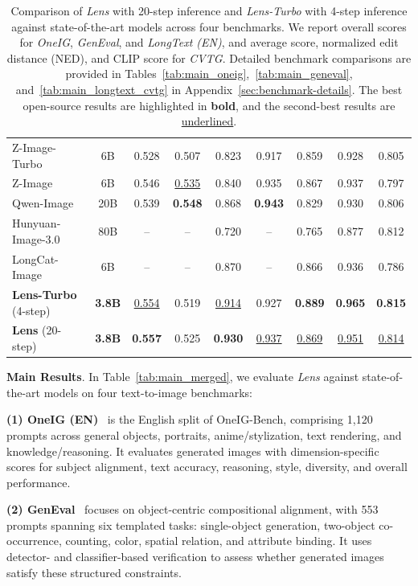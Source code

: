 \documentclass{llmxive}
\begin{document}
\begin{table}[!t]
\begin{tabular}{l|c|cc|c|c|ccc}
    Z-Image-Turbo & 6B
      & 0.528 & 0.507 & 0.823 & 0.917 & 0.859 & 0.928 & 0.805 \\
    Z-Image & 6B
      & 0.546 & \underline{0.535} & 0.840 & 0.935 & 0.867 & 0.937 & 0.797 \\
    Qwen-Image & 20B
      & 0.539 & \textbf{0.548} & 0.868 & \textbf{0.943} & 0.829 & 0.930 & 0.806 \\
    Hunyuan-Image-3.0 & 80B
      & -- & -- & 0.720 & -- & 0.765 & 0.877 & 0.812 \\
    LongCat-Image & 6B
      & -- & -- & 0.870 & -- & 0.866 & 0.936 & 0.786 \\
    \midrule
    \textbf{Lens-Turbo} (4-step) & \textbf{3.8B}
      & \underline{0.554} & 0.519 & \underline{0.914} & 0.927 & \textbf{0.889} & \textbf{0.965} & \textbf{0.815} \\
    \textbf{Lens} (20-step) & \textbf{3.8B}
      & \textbf{0.557} & 0.525 & \textbf{0.930} & \underline{0.937} & \underline{0.869} & \underline{0.951} & \underline{0.814} \\
    \bottomrule
  \end{tabular}
\caption{Comparison of \textit{Lens} with 20-step inference and \textit{Lens-Turbo} with 4-step inference against state-of-the-art models across four benchmarks. We report overall scores for \textit{OneIG}, \textit{GenEval}, and \textit{LongText (EN)}, and average score, normalized edit distance (NED), and CLIP score for \textit{CVTG}. Detailed benchmark comparisons are provided in Tables~\ref{tab:main_oneig},~\ref{tab:main_geneval}, and~\ref{tab:main_longtext_cvtg} in Appendix~\ref{sec:benchmark-details}. The best open-source results are highlighted in \textbf{bold}, and the second-best results are \underline{underlined}.}
\end{table}


\noindent\textbf{Main Results}. In Table~\ref{tab:main_merged}, we evaluate \textit{Lens} against state-of-the-art models on four text-to-image benchmarks: 


\noindent\textbf{(1) OneIG (EN)}~\citep{chang2025oneigbench} is the English split of OneIG-Bench, comprising 1,120 prompts across general objects, portraits, anime/stylization, text rendering, and knowledge/reasoning. It evaluates generated images with dimension-specific scores for subject alignment, text accuracy, reasoning, style, diversity, and overall performance. 

\noindent\textbf{(2) GenEval}~\citep{ghosh2023geneval} focuses on object-centric compositional alignment, with 553 prompts spanning six templated tasks: single-object generation, two-object co-occurrence, counting, color, spatial relation, and attribute binding. It uses detector- and classifier-based verification to assess whether generated images satisfy these structured constraints.
\end{document}
